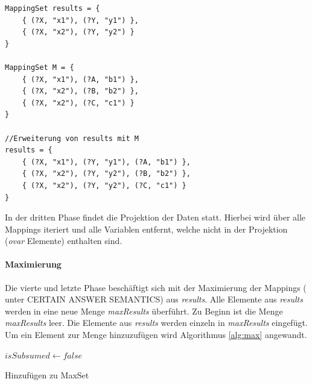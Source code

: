 \documentclass[draft,final]{vutinfth} %
\begin{document}
\begin{lstlisting}[float,caption={Beispiele für Erweiterung der MappingSets},frame=single,label={bspKompMap}]
MappingSet results = { 
	{ (?X, "x1"), (?Y, "y1") }, 
	{ (?X, "x2"), (?Y, "y2") } 
}

MappingSet M = { 
	{ (?X, "x1"), (?A, "b1") }, 
	{ (?X, "x2"), (?B, "b2") },
	{ (?X, "x2"), (?C, "c1") }
}

//Erweiterung von results mit M
results = { 
	{ (?X, "x1"), (?Y, "y1"), (?A, "b1") }, 
	{ (?X, "x2"), (?Y, "y2"), (?B, "b2") },
	{ (?X, "x2"), (?Y, "y2"), (?C, "c1") }
}
\end{lstlisting}

In der dritten Phase findet die Projektion der Daten statt. Hierbei wird über alle Mappings iteriert und alle Variablen entfernt, welche nicht in der Projektion (\textit{ovar} Elemente) enthalten sind. 

\paragraph{Maximierung} \label{maxMapPar}
Die vierte und letzte Phase beschäftigt sich mit der Maximierung der Mappings (\cite[S.~4]{CertainAnswers} unter CERTAIN ANSWER SEMANTICS) aus \textit{results}. Alle Elemente aus \textit{results} werden in eine neue Menge \textit{maxResults} überführt. Zu Beginn ist die Menge \textit{maxResults} leer. Die Elemente aus \textit{results} werden einzeln in \textit{maxResults} eingefügt. Um ein Element zur Menge hinzuzufügen wird Algorithmus \ref{alg:max} angewandt.

\begin{algorithm}
\BlankLine
$isSubsumed\leftarrow false$\;
\BlankLine
{}
\caption{Hinzufügen zu MaxSet}\label{alg:max}
\end{algorithm}
\end{document}
